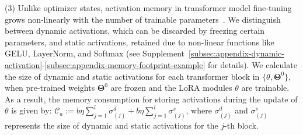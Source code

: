 \documentclass[sigconf]{acmart}
\begin{document}
(3) %
Unlike optimizer states, activation memory in transformer model fine-tuning grows non-linearly with the number of trainable parameters~\cite{ardakani2024slimfit}. We distinguish between dynamic activations, which can be discarded by freezing certain parameters, and static activations, retained due to non-linear functions like GELU, LayerNorm, and Softmax (see {{Supplement~\ref{subsec:appendix-dynamic-activation}-\ref{subsec:appendix-memory-footprint-example}}} for details). We calculate the size of dynamic and static activations for each transformer block in $\{\boldsymbol{\mathcal{\theta}}, \boldsymbol{\Theta}^0\}$, when pre-trained weights $\boldsymbol{\Theta}^0$ are frozen and the LoRA modules $\boldsymbol{\mathcal{\theta}}$ are trainable. As a result, the memory consumption for storing activations during the update of $\boldsymbol{\mathcal{\theta}}$ is given by: $\mathcal{C}_a:=b\eta{\textstyle \sum_{j=1}^{l}}\sigma_{(j)}^d + b\eta{\textstyle \sum_{j=1}^{l}}\sigma_{(j)}^s$, where $\sigma_{(j)}^d$ and $\sigma_{(j)}^s$ represents the size of dynamic and static activations for the $j$-th block.
\end{document}
